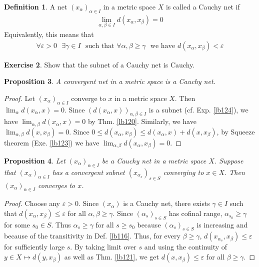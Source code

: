 \documentclass[12pt,b5paper,notitlepage]{article}
\theoremstyle{definition}
\newtheorem{df}{Definition}[section]
\newtheorem{exe}[df]{Exercise}
\theoremstyle{plain}
\newtheorem{pp}[df]{Proposition}
\newcommand{\eps}{\varepsilon}
\numberwithin{equation}{section}
\begin{document}
\begin{df}
A net $(x_\alpha)_{\alpha\in I}$ in a metric space $X$ is called a Cauchy net  if
\begin{align*}
\lim_{\alpha,\beta\in I}d(x_\alpha,x_\beta)=0
\end{align*}
Equivalently, this means that 
\begin{align}
\forall\eps>0~~~\exists \gamma\in I~~~\text{such that }\forall\alpha,\beta\geq\gamma~~~\text{we have }d(x_\alpha,x_\beta)<\eps
\end{align}
\end{df}

\begin{exe}
Show that the subnet of a Cauchy net is Cauchy.
\end{exe}


\begin{pp}\label{lb126}
A convergent net in a metric space is a Cauchy net.
\end{pp}

\begin{proof}
Let $(x_\alpha)_{\alpha\in I}$ converge to $x$ in a metric space $X$. Then $\lim_\alpha d(x_\alpha,x)=0$. Since $(d(x_\alpha,x))_{\alpha,\beta\in I}$ is a subnet (cf. Exp. \ref{lb124}), we have $\lim_{\alpha,\beta} d(x_\alpha,x)=0$ by Thm. \ref{lb120}. Similarly, we have $\lim_{\alpha,\beta}d(x,x_\beta)=0$. Since $0\leq d(x_\alpha,x_\beta)\leq d(x_\alpha,x)+d(x,x_\beta)$, by Squeeze theorem (Exe. \ref{lb123}) we have $\lim_{\alpha,\beta}d(x_\alpha,x_\beta)=0$.
\end{proof}

\begin{comment}
\begin{exe}
Prove Prop. \ref{lb126} directly using the definitions of convergent nets and Cauchy nets.
\end{exe}
\end{comment}


\begin{pp}\label{lb127}
Let $(x_\alpha)_{\alpha\in I}$ be a Cauchy net in a metric space $X$. Suppose that $(x_\alpha)_{\alpha\in I}$ has a convergent subnet $(x_{\alpha_s})_{s\in S}$ converging to $x\in X$. Then $(x_\alpha)_{\alpha\in I}$ converges to $x$.
\end{pp}

\begin{proof}
Choose any $\eps>0$. Since $(x_\alpha)$ is a Cauchy net, there exists $\gamma\in I$ such that $d(x_\alpha,x_\beta)\leq \eps$ for all $\alpha,\beta\geq \gamma$. Since $(\alpha_s)_{s\in S}$ has cofinal range, $\alpha_{s_0}\geq \gamma$ for some $s_0\in S$. Thus $\alpha_s\geq \gamma$ for all $s\geq s_0$ because $(\alpha_s)_{s\in S}$ is increasing and because of the transitivity in Def. \ref{lb116}. Thus, for every $\beta\geq\gamma$, $d(x_{\alpha_s},x_{\beta})\leq\eps$ for sufficiently large $s$. By taking limit over $s$ and using the continuity of $y\in X\mapsto d(y,x_\beta)$ as well as Thm. \ref{lb121}, we get $d(x,x_\beta)\leq \eps$ for all $\beta\geq\gamma$.
\end{proof}
\end{document}
